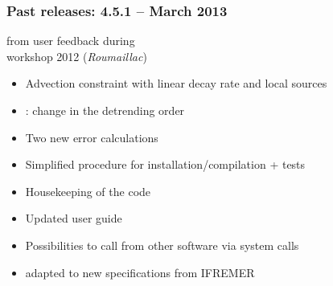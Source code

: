 \begin{frame}[t]
\frametitle{Past releases: 4.5.1 -- March 2013}

 from user feedback during \\
\diva workshop 2012 (\textit{Roumaillac})


\begin{itemize}
\item<2-> Advection constraint with linear decay rate and local sources
\item<3-> : change in the detrending order
\item<4-> Two new error calculations
\item<5-> Simplified procedure for installation/compilation + tests
\item<6-> Housekeeping of the code \\
\item<7-> Updated user guide\\
\item<8-> Possibilities to call \diva from other software via system calls\\

\item<9->  adapted to new specifications from IFREMER

\end{itemize}

\end{frame}


